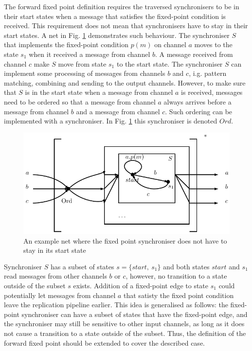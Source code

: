 The forward fixed point definition requires the traversed synchronisers to be in their start states when a message that satisfies the fixed-point condition is received. This requirement does not mean that synchronisers have to stay in their start states. A net in Fig. \ref{fig:ffp_net} demonstrates such behaviour. The synchroniser $S$ that implements the fixed-point condition $p(m)$ on channel $a$ moves to the state $s_1$ when it received a message from channel $b$. A message received from channel $c$ make $S$ move from state $s_1$ to the start state. The synchroniser $S$ can implement some processing of messages from channels $b$ and $c$, i.g. pattern matching, combining and sending to the output channels. However, to make sure that $S$ is in the start state when a message from channel $a$ is received, messages need to be ordered so that a message from channel $a$ always arrives before a message from channel $b$ and a message from channel $c$. Such ordering can be implemented with a synchroniser. In Fig. \ref{fig:ffp_net} this synchroniser is denoted $Ord$.

  \begin{figure}[h!]
  \centering
  \includegraphics{figs/chapter_04_ffp_net.pdf}
  \caption{An example net where the fixed point synchroniser does not have to stay in its start state}
  \label{fig:ffp_net}
  \end{figure}

Synchroniser $S$ has a subset of states $s=\{start, \: s_1\}$ and both states $start$ and $s_1$ read messages from other channels $b$ or $c$, however, no transition to a state outside of the subset $s$ exists. Addition of a fixed-point edge to state $s_1$ could potentially let messages from channel $a$ that satisty the fixed point condition leave the replication pipeline earlier. This idea is generalised as follows: the fixed-point synchroniser can have a subset of states that have the fixed-point edge, and the synchroniser may still be sensitive to other input channels, as long as it does not cause a transition to a state outside of the subset. Thus, the definition of the forward fixed point should be extended to cover the described case.

